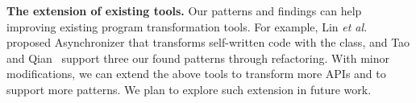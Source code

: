 \noindent
\textbf{The extension of existing tools.} Our patterns and findings can help improving existing program transformation tools. For example, Lin \emph{et al.}~\cite{conf/sigsoft/LinRD14} proposed Asynchronizer that transforms self-written code with the  class, and Tao and Qian~\cite{tao2014refactoring} support three our found patterns through refactoring. With minor modifications, we can extend the above tools to transform more APIs and to support more patterns. We plan to explore such extension in future work.

